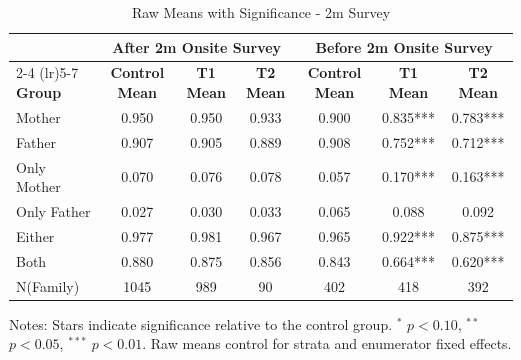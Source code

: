 \begin{table}[htbp]
\centering
\begin{threeparttable}
\caption{Raw Means with Significance  - 2m Survey}
\begin{tabular}{lcccccc}
\toprule
& \multicolumn{3}{c}{After 2m Onsite Survey} & \multicolumn{3}{c}{Before 2m Onsite Survey} \\
\cmidrule(lr){2-4} \cmidrule(lr){5-7}
\textbf{Group} & \textbf{Control Mean} & \textbf{T1 Mean} & \textbf{T2 Mean} & \textbf{Control Mean} & \textbf{T1 Mean} & \textbf{T2 Mean} \\
\midrule
Mother &  0.950 &  0.950 &  0.933  & 0.900 &  0.835*** &  0.783***   \\
Father &  0.907 &  0.905 &  0.889 &   0.908 &  0.752*** &  0.712*** \\
Only Mother &  0.070 &  0.076 &  0.078  &  0.057 &  0.170*** &  0.163***   \\
Only Father &  0.027 &  0.030 &  0.033 & 0.065 &  0.088 &  0.092 \\
Either &  0.977 &  0.981 &  0.967 &  0.965 &  0.922*** &  0.875*** \\
Both &  0.880 &  0.875 &  0.856 & 0.843 &  0.664*** &  0.620*** \\
N(Family) & 1045 & 989 & 90 & 402 & 418 & 392  \\
\bottomrule
\end{tabular}
\begin{tablenotes}
\small
Notes: Stars indicate significance relative to the control group. 
$^{*}$ $p<0.10$, $^{**}$ $p<0.05$, $^{***}$ $p<0.01$.
Raw means control for strata and enumerator fixed effects.
\end{tablenotes}
\end{threeparttable}
\end{table}

